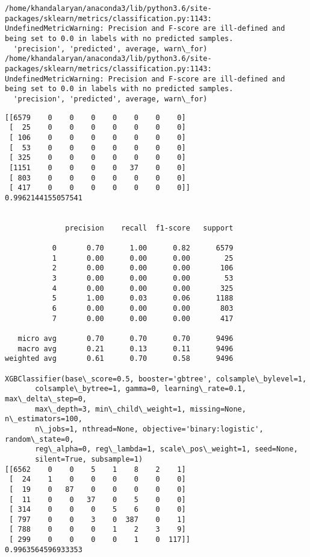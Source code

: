 \documentclass[11pt]{article}
\begin{document}
    \begin{Verbatim}[commandchars=\\\{\}]
/home/khandalaryan/anaconda3/lib/python3.6/site-packages/sklearn/metrics/classification.py:1143: UndefinedMetricWarning: Precision and F-score are ill-defined and being set to 0.0 in labels with no predicted samples.
  'precision', 'predicted', average, warn\_for)
/home/khandalaryan/anaconda3/lib/python3.6/site-packages/sklearn/metrics/classification.py:1143: UndefinedMetricWarning: Precision and F-score are ill-defined and being set to 0.0 in labels with no predicted samples.
  'precision', 'predicted', average, warn\_for)

    \end{Verbatim}

    \begin{Verbatim}[commandchars=\\\{\}]
[[6579    0    0    0    0    0    0    0]
 [  25    0    0    0    0    0    0    0]
 [ 106    0    0    0    0    0    0    0]
 [  53    0    0    0    0    0    0    0]
 [ 325    0    0    0    0    0    0    0]
 [1151    0    0    0    0   37    0    0]
 [ 803    0    0    0    0    0    0    0]
 [ 417    0    0    0    0    0    0    0]]
0.9962144155057541


              precision    recall  f1-score   support

           0       0.70      1.00      0.82      6579
           1       0.00      0.00      0.00        25
           2       0.00      0.00      0.00       106
           3       0.00      0.00      0.00        53
           4       0.00      0.00      0.00       325
           5       1.00      0.03      0.06      1188
           6       0.00      0.00      0.00       803
           7       0.00      0.00      0.00       417

   micro avg       0.70      0.70      0.70      9496
   macro avg       0.21      0.13      0.11      9496
weighted avg       0.61      0.70      0.58      9496

XGBClassifier(base\_score=0.5, booster='gbtree', colsample\_bylevel=1,
       colsample\_bytree=1, gamma=0, learning\_rate=0.1, max\_delta\_step=0,
       max\_depth=3, min\_child\_weight=1, missing=None, n\_estimators=100,
       n\_jobs=1, nthread=None, objective='binary:logistic', random\_state=0,
       reg\_alpha=0, reg\_lambda=1, scale\_pos\_weight=1, seed=None,
       silent=True, subsample=1)
[[6562    0    0    5    1    8    2    1]
 [  24    1    0    0    0    0    0    0]
 [  19    0   87    0    0    0    0    0]
 [  11    0    0   37    0    5    0    0]
 [ 314    0    0    0    5    6    0    0]
 [ 797    0    0    3    0  387    0    1]
 [ 788    0    0    0    1    2    3    9]
 [ 299    0    0    0    0    1    0  117]]
0.9963564596933353



\end{Verbatim}
\end{document}
